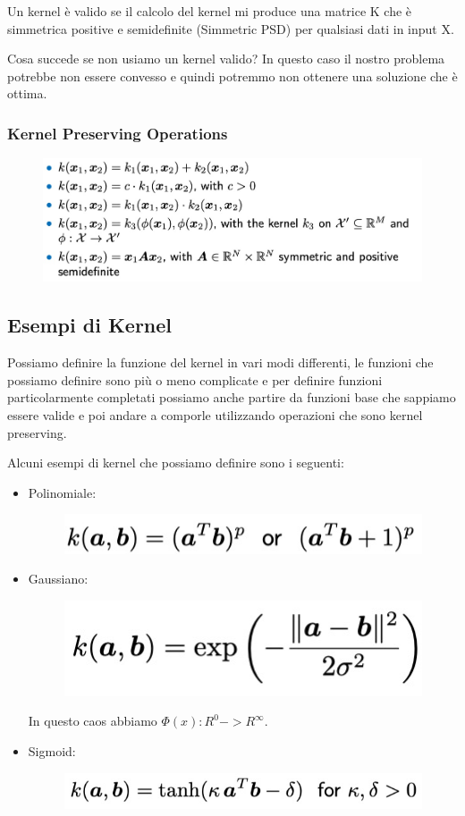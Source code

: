 \documentclass[14pt]{extreport}
\begin{document}
Un kernel è valido se il calcolo del kernel mi produce una matrice K che è simmetrica positive e semidefinite (Simmetric PSD) per qualsiasi dati in
input X.

Cosa succede se non usiamo un kernel valido? In questo caso il nostro problema potrebbe non essere convesso e quindi potremmo non ottenere una
soluzione che è ottima.

\subsubsection{Kernel Preserving Operations}

\begin{figure}[H]
\centering
\includegraphics[width=0.7\linewidth]{342.jpeg}
\end{figure}

\subsection{Esempi di Kernel}

Possiamo definire la funzione del kernel in vari modi differenti, le funzioni che possiamo definire sono più o meno complicate e per definire funzioni
particolarmente completati possiamo anche partire da funzioni base che sappiamo essere valide e poi andare a comporle utilizzando operazioni che sono
kernel preserving.

Alcuni esempi di kernel che possiamo definire sono i seguenti:

\begin{itemize}
\item Polinomiale: \begin{figure}[H]
\centering
\includegraphics[width=0.5\linewidth]{343.jpeg}
\end{figure}
\item Gaussiano:\begin{figure}[H]
\centering
\includegraphics[width=0.4\linewidth]{344.jpeg}
\end{figure}
In questo caos abbiamo $\Phi(x): R^0 -> R^\infty$.
\item Sigmoid:\begin{figure}[H]
\centering
\includegraphics[width=0.5\linewidth]{345.jpeg}
\end{figure}
\end{itemize}
\end{document}
